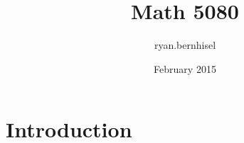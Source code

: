 \documentclass{article}
\title{Math 5080}
\author{ryan.bernhisel }
\date{February 2015}
\begin{document}
\maketitle

\section{Introduction}
\end{document}
